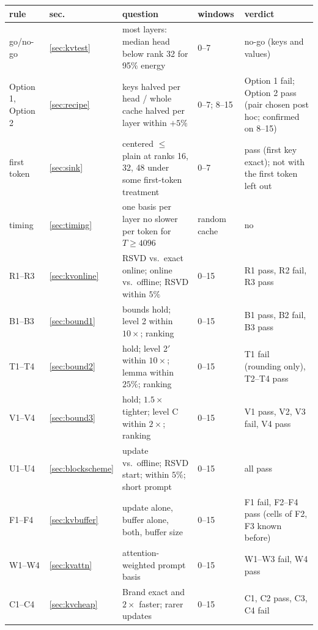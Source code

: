 \documentclass[10pt]{article}
\theoremstyle{plain}
\theoremstyle{definition}
\theoremstyle{remark}
\newcommand{\rl}[1]{\textsf{#1}}%
\begin{document}
\begin{table}[p]
\centering\footnotesize
\begin{tabularx}{\textwidth}{@{}>{\raggedright}p{2.4cm} >{\raggedright}p{0.7cm} >{\raggedright}X >{\raggedright}p{1.4cm} >{\raggedright\arraybackslash}p{4.0cm}@{}}
\toprule
\textbf{rule} & \textbf{sec.} & \textbf{question} & \textbf{windows} & \textbf{verdict}\\
\midrule
go/no-go & \ref{sec:kvtest} & most layers: median head below rank 32 for 95\% energy & 0--7 & no-go (keys and values)\\
Option 1, Option 2 & \ref{sec:recipe} & keys halved per head / whole cache halved per layer within $+5\%$ & 0--7; 8--15 & Option 1 fail; Option 2 pass (pair chosen post hoc; confirmed on 8--15)\\
first token & \ref{sec:sink} & centered $\le$ plain at ranks 16, 32, 48 under some first-token treatment & 0--7 & pass (first key exact); not with the first token left out\\
timing & \ref{sec:timing} & one basis per layer no slower per token for $T\ge4096$ & random cache & no\\
\rl{R1}--\rl{R3} & \ref{sec:kvonline} & RSVD vs.\ exact online; online vs.\ offline; RSVD within $5\%$ & 0--15 & \rl{R1} pass, \rl{R2} fail, \rl{R3} pass\\
\rl{B1}--\rl{B3} & \ref{sec:bound1} & bounds hold; level 2 within $10\times$; ranking & 0--15 & \rl{B1} pass, \rl{B2} fail, \rl{B3} pass\\
\rl{T1}--\rl{T4} & \ref{sec:bound2} & hold; level 2$'$ within $10\times$; lemma within $25\%$; ranking & 0--15 & \rl{T1} fail (rounding only), \rl{T2}--\rl{T4} pass\\
\rl{V1}--\rl{V4} & \ref{sec:bound3} & hold; $1.5\times$ tighter; level C within $2\times$; ranking & 0--15 & \rl{V1} pass, \rl{V2}, \rl{V3} fail, \rl{V4} pass\\
\rl{U1}--\rl{U4} & \ref{sec:blockscheme} & update vs.\ offline; RSVD start; within $5\%$; short prompt & 0--15 & all pass\\
\rl{F1}--\rl{F4} & \ref{sec:kvbuffer} & update alone, buffer alone, both, buffer size & 0--15 & \rl{F1} fail, \rl{F2}--\rl{F4} pass (cells of \rl{F2}, \rl{F3} known before)\\
\rl{W1}--\rl{W4} & \ref{sec:kvattn} & attention-weighted prompt basis & 0--15 & \rl{W1}--\rl{W3} fail, \rl{W4} pass\\
\rl{C1}--\rl{C4} & \ref{sec:kvcheap} & Brand exact and $2\times$ faster; rarer updates & 0--15 & \rl{C1}, \rl{C2} pass, \rl{C3}, \rl{C4} fail\\

\end{tabularx}
\end{table}
\end{document}

